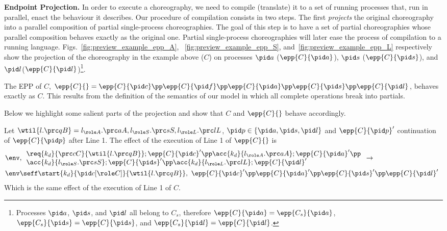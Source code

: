 \textbf{Endpoint Projection.}
In order to execute a choreography, we need to compile (translate) it to a
set of running processes that, run in parallel, enact the behaviour it
describes. Our procedure of compilation consists in two steps. The first
\emph{projects} the original choreography into a parallel composition of
partial single-process choreographies. The goal of this step is to have a set
of partial choreographies whose parallel composition behaves exactly as the
original one. Partial single-process choreographies will later ease the process
of compilation to a running language. Figs.~\ref{fig:preview_example_epp_A},
~\ref{fig:preview_example_epp_S}, and~\ref{fig:preview_example_epp_L}
respectively show the projection of the choreography in the example above ($C$)
on processes $\pid a$ ($\epp {C}{\pid a}$), $\pid s$ ($\epp{C}{\pid s}$), and
$\pid l$($\epp{C}{\pid l}$)\footnote{Processes $\pid a$, $\pid s$, and $\pid l$
all belong to $C_s$, therefore $\epp{C}{\pid a} =
\epp{C_s}{\pid a}$, $\epp{C_s}{\pid s} = \epp{C}{\pid s}$, and $\epp{C_s} {\pid
l} = \epp{C}{\pid l}$.}.

The EPP of $C$, $\epp{C}{} = \epp{C}{\pid c} \pp \epp{C}{\pid f} \pp \epp{C}
{\pid a} \pp \epp{C}{\pid s} \pp \epp{C}{\pid l}$, behaves exactly as $C$. This
results from the definition of the semantics of our model in which all complete
operations break into partials.

Below we highlight some salient parts of the projection and show that $C$ and
$\epp{C}{}$ behave accordingly.

Let $\wtil{l.\prc qB} = l_{\role A}.\prc aA,l_{\role S}.\prc sS,l_{\role
L}.\prc lL$, $\pid p \in \{\pid a, \pid s, \pid l\}$ and $\epp{C}{\pid p}'$
continuation of $\epp {C} {\pid p}$ after Line 1. The effect of the execution
of Line 1 of $\epp {C} {}$ is
{\footnotesize
$$
\hspace{-5pt}\begin{array}{l}
\env,\begin{array}{l}
\req{k_d}{\prc cC}{\wtil{l.\prc qB}}; \epp{C}{\pid c}' \pp \acc{k_d}{l_{\role A}.\prc aA}; \epp{C}{\pid a}' \pp \\
\acc{k_d}{l_{\role S}.\prc sS}; \epp{C}{\pid s}' \pp \acc{k_d}{l_{\role L}.\prc lL}; \epp{C}{\pid l}'		
\end{array}
\to
\\[10pt]
\env \seff \start{k_d}{\pid c[\role C]}{\wtil{l.\prc qB}},\ 
\epp{C}{\pid c}' \pp \epp{C}{\pid a}' \pp \epp{C}{\pid s}' \pp 
\epp{C}{\pid l}'		
\end{array} 
$$
}
Which is the same effect of the execution of Line 1 of $C$.

